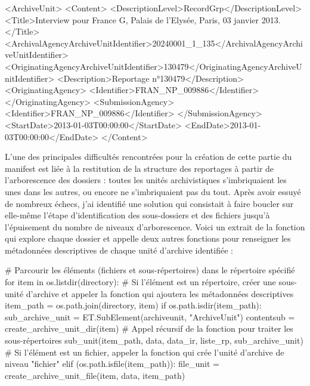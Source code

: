 \begin{xml}
<ArchiveUnit>
	<Content>
		<DescriptionLevel>RecordGrp</DescriptionLevel>
		<Title>Interview pour France G, Palais de l'Elysée, Paris, 03 janvier 2013.</Title>
		<ArchivalAgencyArchiveUnitIdentifier>20240001_1_135</ArchivalAgencyArchiveUnitIdentifier>
		<OriginatingAgencyArchiveUnitIdentifier>130479</OriginatingAgencyArchiveUnitIdentifier>
		<Description>Reportage n°130479</Description>
		<OriginatingAgency>
			<Identifier>FRAN_NP_009886</Identifier>
		</OriginatingAgency>
		<SubmissionAgency>
			<Identifier>FRAN_NP_009886</Identifier>
		</SubmissionAgency>
		<StartDate>2013-01-03T00:00:00</StartDate>
		<EndDate>2013-01-03T00:00:00</EndDate>
	</Content>
\end{xml}

L'une des principales difficultés rencontrées pour la création de cette partie du manifest est liée à la restitution de la structure des reportages à partir de l'arborescence des dossiers : toutes les unités archivistiques s'imbriquaient les unes dans les autres, ou encore ne s'imbriquaient pas du tout. Après avoir essuyé de nombreux échecs, j'ai identifié une solution qui consistait à faire boucler sur elle-même l'étape d'identification des sous-dossiers et des fichiers jusqu'à l'épuisement du nombre de niveaux d'arborescence. Voici un extrait de la fonction qui explore chaque dossier et appelle deux autres fonctions pour renseigner les métadonnées descriptives de chaque unité d'archive identifiée : 
\\
\begin{python}
# Parcourir les éléments (fichiers et sous-répertoires) dans le répertoire spécifié
for item in os.listdir(directory):
	# Si l'élément est un répertoire, créer une sous-unité d'archive et appeler la fonction qui ajoutera les métadonnées descriptives
	item_path = os.path.join(directory, item)
	if os.path.isdir(item_path):
		sub_archive_unit = ET.SubElement(archiveunit, "ArchiveUnit")
		contentsub = create_archive_unit_dir(item)
		# Appel récursif de la fonction pour traiter les sous-répertoires
		sub_unit(item_path, data, data_ir, liste_rp, sub_archive_unit)
	# Si l'élément est un fichier, appeler la fonction qui crée l'unité d'archive de niveau "fichier"
	elif (os.path.isfile(item_path)):
		file_unit = create_archive_unit_file(item, data, item_path)
\end{python}

